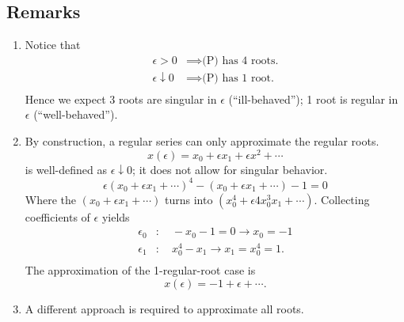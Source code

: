 \documentclass[12pt,twoside]{article}
\begin{document}
\subsection{Remarks}
\begin{enumerate}
\item
  Notice that
  \begin{equation*}
    \begin{aligned}
      \epsilon>0 &\implies \text{(P) has 4 roots.} \\
      \epsilon\downarrow0 &\implies \text{(P) has 1 root.} \\
    \end{aligned}
  \end{equation*}
  Hence we expect 3 roots are singular in $\epsilon$ (``ill-behaved''); 1 root
  is regular in $\epsilon$ (``well-behaved'').
\item By construction, a regular series can only approximate the regular roots.
  \begin{equation*}
    x(\epsilon) = x_0 + \epsilon x_1 + \epsilon x^2 + \cdots
  \end{equation*}
  is well-defined as $\epsilon\downarrow0$; it does not allow for singular
  behavior.
  \begin{equation*}
    \epsilon{(x_0+\epsilon x_1 + \cdots)}^4-(x_0+\epsilon x_1 + \cdots)-1=0
  \end{equation*}
  Where the $(x_0+\epsilon x_1 + \cdots)$ turns into
  $(x_0^4+\epsilon4x_0^3x_1+\cdots)$. Collecting coefficients of $\epsilon$
  yields
  \begin{equation*}
    \begin{aligned}
      \epsilon_0 &:\quad -x_0-1=0 \rightarrow x_0=-1 \\
      \epsilon_1 &:\quad x_0^4-x_1 \rightarrow x_1=x_0^4=1. \\
    \end{aligned}
  \end{equation*}
  The approximation of the 1-regular-root case is
  \begin{equation*}
    x(\epsilon) = -1 + \epsilon + \cdots.
  \end{equation*}
\item A different approach is required to approximate all roots.
\end{enumerate}
\end{document}
